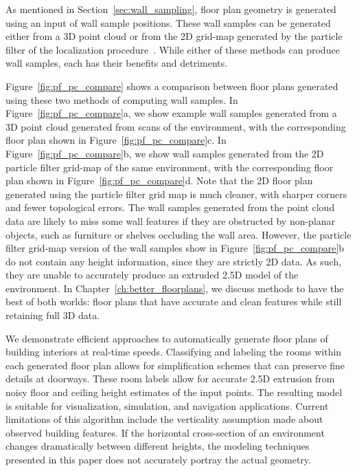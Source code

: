 \documentclass[12pt,onecolumn,oneside]{book}
\begin{document}
As mentioned in Section~\ref{sec:wall_sampling}, floor plan geometry is generated using an input of wall sample positions.  These wall samples can be generated either from a 3D point cloud or from the 2D grid-map generated by the particle filter of the localization procedure~\cite{NickJournal}.  While either of these methods can produce wall samples, each has their benefits and detriments.

Figure~\ref{fig:pf_pc_compare} shows a comparison between floor plans generated using these two methods of computing wall samples.  In Figure~\ref{fig:pf_pc_compare}a, we show example wall samples generated from a 3D point cloud generated from scans of the environment, with the corresponding floor plan shown in Figure~\ref{fig:pf_pc_compare}c.  In Figure~\ref{fig:pf_pc_compare}b, we show wall samples generated from the 2D particle filter grid-map of the same environment, with the corresponding floor plan shown in Figure~\ref{fig:pf_pc_compare}d.  Note that the 2D floor plan generated using the particle filter grid map is much cleaner, with sharper corners and fewer topological errors.  The wall samples generated from the point cloud data are likely to miss some wall features if they are obstructed by non-planar objects, such as furniture or shelves occluding the wall area.  However, the particle filter grid-map version of the wall samples show in Figure~\ref{fig:pf_pc_compare}b do not contain any height information, since they are strictly 2D data.  As such, they are unable to accurately produce an extruded 2.5D model of the environment.  In Chapter~\ref{ch:better_floorplans}, we discuss methods to have the best of both worlds:  floor plans that have accurate and clean features while still retaining full 3D data.

We demonstrate efficient approaches to automatically generate floor plans of building interiors at real-time speeds.  Classifying and labeling the rooms within each generated floor plan allows for simplification schemes that can preserve fine details at doorways.  These room labels allow for accurate 2.5D extrusion from noisy floor and ceiling height estimates of the input points.  The resulting model is suitable for visualization, simulation, and navigation applications.  Current limitations of this algorithm include the verticality assumption made about observed building features.  If the horizontal cross-section of an environment changes dramatically between different heights, the modeling techniques presented in this paper does not accurately portray the actual geometry.
\end{document}
